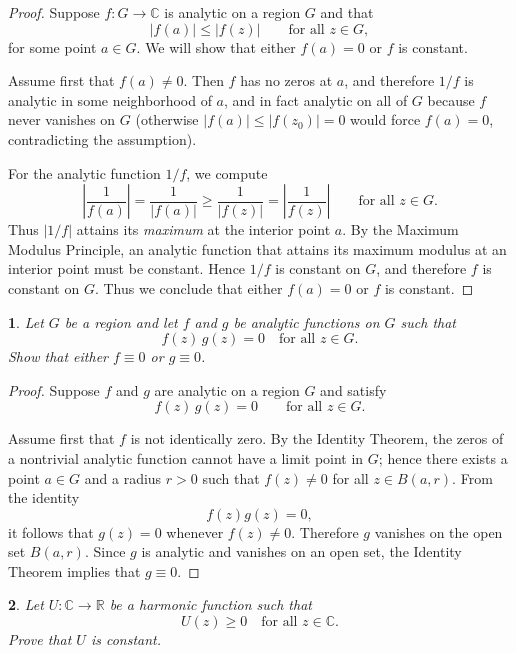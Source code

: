 \documentclass[12pt, a4paper]{report}
\theoremstyle{spaced}
\newtheorem{exercise}{}
\newcommand{\setexercise}[1]{\setcounter{exercise}{#1-1}}
\begin{document}
\begin{proof}
	Suppose $f : G \to \mathbb{C}$ is analytic on a region $G$ and that
	\[
		|f(a)| \le |f(z)| \qquad \text{for all } z\in G,
	\]
	for some point $a\in G$.
	We will show that either $f(a)=0$ or $f$ is constant.

	Assume first that $f(a)\neq 0$.
	Then $f$ has no zeros at $a$, and therefore $1/f$ is analytic in some neighborhood of $a$, and in fact analytic on all of $G$ because $f$ never vanishes on $G$ (otherwise $|f(a)|\le |f(z_0)|=0$ would force $f(a)=0$, contradicting the assumption).

	For the analytic function $1/f$, we compute
	\[
		\left|\frac{1}{f(a)}\right|
		= \frac{1}{|f(a)|}
		\ge \frac{1}{|f(z)|}
		= \left|\frac{1}{f(z)}\right|
		\qquad \text{for all } z\in G.
	\]
	Thus $|1/f|$ attains its \emph{maximum} at the interior point $a$.
	By the Maximum Modulus Principle, an analytic function that attains its maximum modulus at an interior point must be constant.
	Hence $1/f$ is constant on $G$, and therefore $f$ is constant on $G$.
	Thus we conclude that either $f(a)=0$ or $f$ is constant.
\end{proof}


\setexercise{8}
\begin{exercise}
	Let $G$ be a region and let $f$ and $g$ be analytic functions on $G$ such that
	\[
		f(z)\,g(z)=0 \quad \text{for all } z \in G.
	\]
	Show that either $f \equiv 0$ or $g \equiv 0$.
\end{exercise}

\begin{proof}
	Suppose $f$ and $g$ are analytic on a region $G$ and satisfy
	\[
		f(z)\,g(z)=0 \qquad \text{for all } z\in G.
	\]

	Assume first that $f$ is not identically zero.
	By the Identity Theorem, the zeros of a nontrivial analytic function cannot have a limit point in $G$; hence there exists a point $a\in G$ and a radius $r>0$ such that
	\(f(z)\neq 0\) for all \(z\in B(a,r).\)
	From the identity
	\[
		f(z)g(z)=0,
	\]
	it follows that $g(z)=0$ whenever $f(z)\neq 0$.
	Therefore $g$ vanishes on the open set $B(a,r)$.
	Since $g$ is analytic and vanishes on an open set, the Identity Theorem implies that
	\(
	g\equiv0.
	\)
\end{proof}

\setexercise{9}
\begin{exercise}
	Let $U \colon \mathbb{C} \to \mathbb{R}$ be a harmonic function such that
	\[
		U(z) \ge 0 \quad \text{for all } z\in \mathbb{C}.
	\]
	Prove that $U$ is constant.
\end{exercise}
\end{document}
